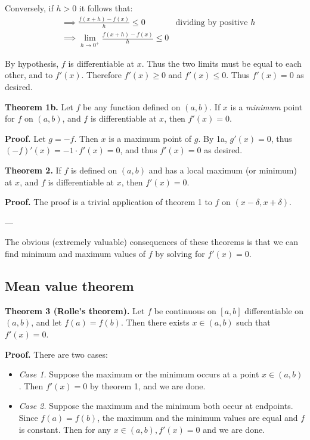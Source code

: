 Conversely, if $h>0$ it follows that:
\begin{align*}
  &\implies \frac{f(x+h)-f(x)}{h}\leq0&\text{dividing by positive $h$}\\
  &\implies \lim_{h\to0^+}\frac{f(x+h)-f(x)}{h}\leq0
\end{align*}

By hypothesis, $f$ is differentiable at $x$. Thus the two limits must
be equal to each other, and to $f'(x)$. Therefore $f'(x)\geq0$ and
$f'(x)\leq0$. Thus $f'(x)=0$ as desired.

\vs

\textbf{Theorem 1b.} Let $f$ be any function defined on $(a,b)$. If
$x$ is a \textit{minimum} point for $f$ on $(a,b)$, and $f$ is
differentiable at $x$, then $f'(x)=0$.

\vs

\textbf{Proof.} Let $g=-f$. Then $x$ is a maximum point of $g$. By 1a,
$g'(x)=0$, thus $(-f)'(x)=-1\cdot f'(x)=0$, and thus $f'(x)=0$ as desired.

\vs

\textbf{Theorem 2.} If $f$ is defined on $(a,b)$ and has a local
maximum (or minimum) at $x$, and $f$ is differentiable at $x$, then
$f'(x)=0$.

\vs

\textbf{Proof.} The proof is a trivial application of theorem 1 to $f$
on $(x-\delta, x+\delta)$.

\vs---\vs

The obvious (extremely valuable) consequences of these theorems is
that we can find minimum and maximum values of $f$ by solving for
$f'(x)=0$.

\subsection{Mean value theorem}

\textbf{Theorem 3 (Rolle's theorem).} Let $f$ be continuous on $[a,b]$
differentiable on $(a,b)$, and let $f(a)=f(b)$. Then there exists
$x\in(a,b)$ such that $f'(x)=0$.

\vs

\textbf{Proof.} There are two cases:
\begin{itemize}
\item \textit{Case 1.} Suppose the maximum or the minimum occurs at a
  point $x\in(a,b)$. Then $f'(x)=0$ by theorem 1, and we are done.
\item \textit{Case 2.} Suppose the maximum and the minimum both occur
  at endpoints. Since $f(a)=f(b)$, the maximum and the minimum values
  are equal and $f$ is constant. Then for any $x\in(a,b), f'(x)=0$ and
  we are done.
\end{itemize}

